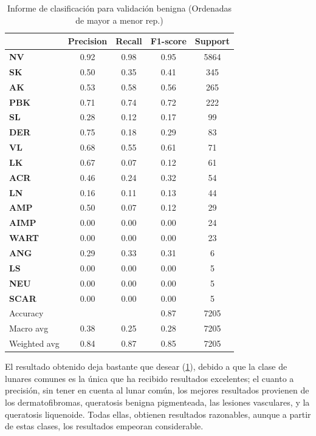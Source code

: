  
\begin{table}[!ht]
	\centering
	\begin{tabular}{|l|c|c|c|c|}
		\hline
		& Precision & Recall & F1-score & Support \\
		\hline
		       \textbf{NV} & 0.92 & 0.98 & 0.95 & 5864 \\ \hline
		       \textbf{SK} & 0.50 & 0.35 & 0.41 & 345 \\ \hline
		       \textbf{AK} & 0.53 & 0.58 & 0.56 & 265 \\ \hline
		       \textbf{PBK} & 0.71 & 0.74 & 0.72 & 222 \\ \hline
		       \textbf{SL} & 0.28 & 0.12 & 0.17 & 99 \\ \hline
		       \textbf{DER} & 0.75 & 0.18 & 0.29 & 83 \\ \hline
		       \textbf{VL} & 0.68 & 0.55 & 0.61 & 71 \\ \hline
		       \textbf{LK} & 0.67 & 0.07 & 0.12 & 61 \\ \hline
		       \textbf{ACR} & 0.46 & 0.24 & 0.32 & 54 \\ \hline
		       \textbf{LN} & 0.16 & 0.11 & 0.13 & 44 \\ \hline
		       \textbf{AMP} & 0.50 & 0.07 & 0.12 & 29 \\ \hline
		       \textbf{AIMP} & 0.00 & 0.00 & 0.00 & 24 \\ \hline
		       \textbf{WART} & 0.00 & 0.00 & 0.00 & 23 \\ \hline
		       \textbf{ANG} & 0.29 & 0.33 & 0.31 & 6 \\ \hline
		       \textbf{LS} & 0.00 & 0.00 & 0.00 & 5 \\ \hline
		       \textbf{NEU} & 0.00 & 0.00 & 0.00 & 5 \\ \hline
		       \textbf{SCAR} & 0.00 & 0.00 & 0.00 & 5 \\ \hline
		\hline
		Accuracy &  &  & 0.87 & 7205 \\
		Macro avg & 0.38& 0.25& 0.28&7205\\
		Weighted avg&0.84&0.87&0.85&7205\\
		\hline
	\end{tabular}
	\caption{Informe de clasificación para validación benigna (Ordenadas de mayor a menor rep.)}
	\label{tab:benignomalmetrics}
\end{table}

El resultado obtenido deja bastante que desear  (\ref{tab:benignomalmetrics}), debido a que la clase de lunares comunes es la única que ha recibido resultados excelentes; el cuanto a precisión, sin tener en cuenta al lunar común,  los mejores resultados provienen de los dermatofibromas, queratosis benigna pigmenteada,  las lesiones vasculares, y la queratosis liquenoide. Todas ellas, obtienen resultados razonables, aunque a partir de estas clases, los resultados empeoran considerable.


